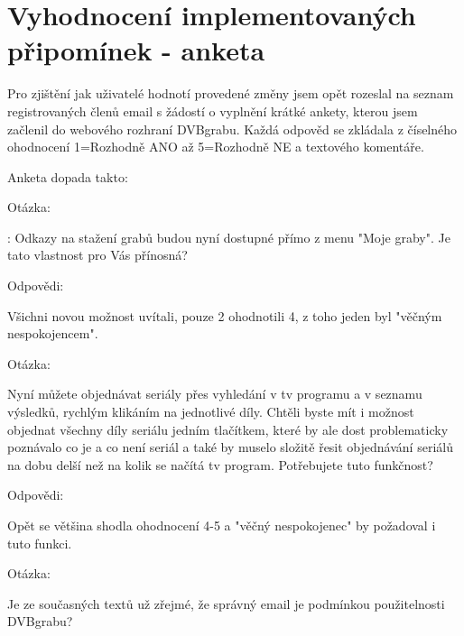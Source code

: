 \vspace{10pt}

\section{Vyhodnocení implementovaných připomínek - anketa}

Pro zjištění jak uživatelé hodnotí provedené změny jsem opět rozeslal na seznam registrovaných členů email s žádostí o vyplnění krátké ankety, kterou jsem začlenil do webového rozhraní DVBgrabu. Každá odpověd se zkládala z číselného ohodnocení 1=Rozhodně ANO až 5=Rozhodně NE a textového komentáře.

\vspace{10pt}

Anketa dopada takto:

\vspace{10pt}

\begin{bf}Otázka:\end{bf}: Odkazy na stažení grabů budou nyní dostupné přímo z menu "Moje graby". Je tato vlastnost pro Vás přínosná?

\begin{bf}Odpovědi:\end{bf} Všichni novou možnost uvítali, pouze 2 ohodnotili 4, z toho jeden byl "věčným nespokojencem".

\vspace{10pt}

\begin{bf}Otázka:\end{bf} Nyní můžete objednávat seriály přes vyhledání v tv programu a v seznamu výsledků, rychlým klikáním na jednotlivé díly. Chtěli byste mít i možnost objednat všechny díly seriálu jedním tlačítkem, které by ale dost problematicky poznávalo co je a co není seriál a také by muselo složitě řesit objednávání seriálů na dobu delší než na kolik se načítá tv program. Potřebujete tuto funkčnost?

\begin{bf}Odpovědi:\end{bf} Opět se většina shodla ohodnocení 4-5 a "věčný nespokojenec" by požadoval i tuto funkci.

\vspace{10pt}
						
\begin{bf}Otázka:\end{bf} Je ze současných textů už zřejmé, že správný email je podmínkou použitelnosti DVBgrabu?

